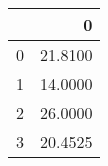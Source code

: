 \begin{tabular}{lr}
\toprule
{} &        0 \\
\midrule
0 &  21.8100 \\
1 &  14.0000 \\
2 &  26.0000 \\
3 &  20.4525 \\
\bottomrule
\end{tabular}
